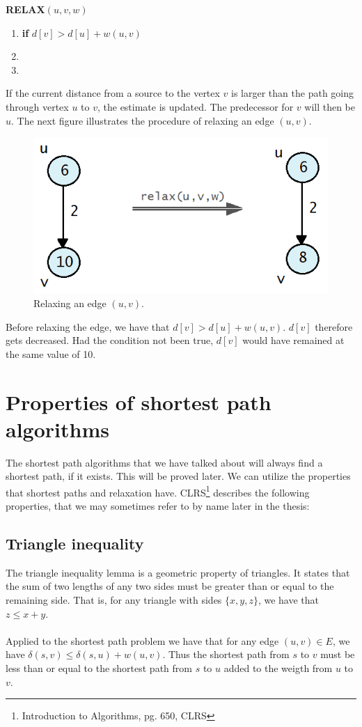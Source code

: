 \documentclass[11pt]{article}
\begin{document}
\textbf{RELAX$(u, v, w)$}
\begin{enumerate}
\setlength\itemsep{0em}
\item \textbf{if } $d[v] > d[u] + w(u,v)$
\item {}
\item {}
\end{enumerate}
If the current distance from a source to the vertex $v$ is larger than the path going through vertex $u$ to $v$, the estimate is updated. The predecessor for $v$ will then be $u$. The next figure illustrates the procedure of relaxing an edge $(u,v)$.

\begin{figure}[H]
\centering
\includegraphics[scale=0.4]{Pictures/Relaxation-example.png}
\caption{Relaxing an edge $(u,v)$.}
\end{figure}

\noindent Before relaxing the edge, we have that $d[v] > d[u] + w(u,v)$. $d[v]$ therefore gets decreased. Had the condition not been true, $d[v]$ would have remained at the same value of 10.

\section{Properties of shortest path algorithms}
The shortest path algorithms that we have talked about will always find a shortest path, if it exists. This will be proved later. We can utilize the properties that shortest paths and relaxation have. CLRS\footnote{Introduction to Algorithms, pg. 650, CLRS} describes the following properties, that we may sometimes refer to by name later in the thesis:

\subsection{Triangle inequality}
The triangle inequality lemma is a geometric property of triangles. It states that the sum of two lengths of any two sides must be greater than or equal to the remaining side. That is, for any triangle with sides $\{x,y,z\}$, we have that $z \leq x+y$.\\\\
Applied to the shortest path problem we have that for any edge $(u,v) \in E$, we have $\delta(s,v)\leq \delta(s,u) + w(u,v)$. Thus the shortest path from $s$ to $v$ must be less than or equal to the shortest path from $s$ to $u$ added to the weigth from $u$ to $v$.\\
\end{document}
